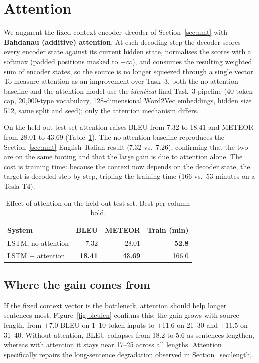 \documentclass[sigconf,nonacm]{acmart}
\begin{document}
\section{Attention}
\label{sec:attn}

We augment the fixed-context encoder--decoder of Section~\ref{sec:nmt} with
\textbf{Bahdanau (additive) attention}. At each decoding step the decoder scores
every encoder state against its current hidden state, normalises the scores with
a softmax (padded positions masked to $-\infty$), and consumes the resulting
weighted sum of encoder states, so the source is no longer squeezed through a
single vector. To measure attention as an improvement over Task~3, both the
no-attention baseline and the attention model use the \emph{identical} final
Task~3 pipeline (40-token cap, 20{,}000-type vocabulary, 128-dimensional
Word2Vec embeddings, hidden size 512, same split and seed); only the attention
mechanism differs.

On the held-out test set attention raises BLEU from 7.32 to 18.41 and METEOR
from 28.01 to 43.69 (Table~\ref{tab:attention}). The no-attention baseline
reproduces the Section~\ref{sec:nmt} English--Italian result (7.32 vs.\ 7.26),
confirming that the two are on the same footing and that the large gain is due to
attention alone. The cost is training time: because the context now depends on
the decoder state, the target is decoded step by step, tripling the training time
(166 vs.\ 53 minutes on a Tesla T4).

\begin{table}[h]
\caption{Effect of attention on the held-out test set. Best per column bold.}
\label{tab:attention}
\scriptsize
\setlength{\tabcolsep}{3pt}
\begin{tabular}{lrrr}
\toprule
\textbf{System} & \textbf{BLEU} & \textbf{METEOR} & \textbf{Train (min)} \\
\midrule
LSTM, no attention & 7.32 & 28.01 & \textbf{52.8} \\
LSTM + attention   & \textbf{18.41} & \textbf{43.69} & 166.0 \\
\bottomrule
\end{tabular}
\end{table}

\subsection{Where the gain comes from}

If the fixed context vector is the bottleneck, attention should help longer
sentences most. Figure~\ref{fig:bleulen} confirms this: the gain grows with
source length, from $+7.0$ BLEU on 1--10-token inputs to $+11.6$ on 21--30 and
$+11.5$ on 31--40. Without attention, BLEU collapses from 18.2 to 5.6 as
sentences lengthen, whereas with attention it stays near 17--25 across all
lengths. Attention specifically repairs the long-sentence degradation observed in
Section~\ref{sec:length}.
\end{document}
